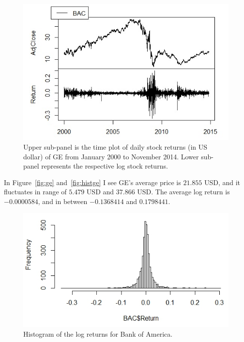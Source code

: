 \documentclass[a4paper,11pt,english]{article}
\begin{document}
			\begin{figure}
				\begin{center}
					\includegraphics[scale=0.6]{BAC}
					\caption{Upper sub-panel is the time plot of daily stock returns (in US dollar) of GE from January 2000 to November 2014. Lower 
					sub-panel represents the respective log stock returns.}  
					\label{fig:bac}
				\end{center}
			\end{figure}

			In Figure~\ref{fig:ge} and~\ref{fig:histge} I see GE's average price is $21.855$ USD, and it fluctuates in range of $5.479$ USD and $37.866$ 
			USD. The average log return is $-0.0000584 $, and in between $-0.1368414$ and $0.1798441$. 
		
			\begin{figure}
				\begin{center}
					\includegraphics[scale=0.6]{HistBAC.PNG}
					\caption{Histogram of the log returns for Bank of America.}
					\label{fig:histbac}
				\end{center}
			\end{figure}
		 
\end{document}
